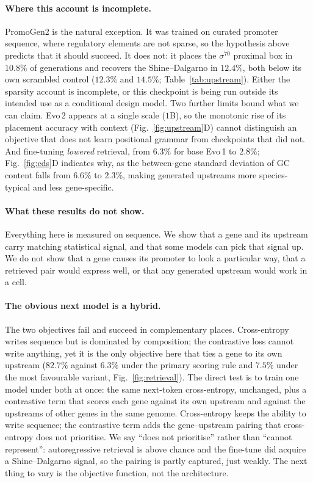 \documentclass{article}
\newcommand{\rev}[1]{\begingroup\color{red}#1\endgroup}
\begin{document}
\rev{\paragraph{Where this account is incomplete.}
PromoGen2 is the natural exception. It was trained on curated promoter sequence,
where regulatory elements are not sparse, so the hypothesis above predicts that
it should succeed. It does not: it places the $\sigma^{70}$ proximal box in
$10.8\%$ of generations and recovers the Shine--Dalgarno in $12.4\%$, both below
its own scrambled control ($12.3\%$ and $14.5\%$; Table~\ref{tab:upstream}).
Either the sparsity account is incomplete, or this checkpoint is being run
outside its intended use as a conditional design model. Two further limits bound
what we can claim. Evo\,2 appears at a single scale ($1$B), so the monotonic rise
of its placement accuracy with context (Fig.~\ref{fig:upstream}D) cannot
distinguish an objective that does not learn positional grammar from checkpoints
that did not. And fine-tuning \emph{lowered} retrieval, from $6.3\%$ for base
Evo\,1 to $2.8\%$; Fig.~\ref{fig:cds}D indicates why, as the between-gene
standard deviation of GC content falls from $6.6\%$ to $2.3\%$, making generated
upstreams more species-typical and less gene-specific.}

\paragraph{What these results do not show.}
Everything here is measured on sequence. We show that a gene and its upstream
carry matching statistical signal, and that some models can pick that signal up.
We do not show that a gene causes its promoter to look a particular way,
that a retrieved pair would express well, or that any generated upstream would
work in a cell. 

\paragraph{The obvious next model is a hybrid.}
The two objectives fail and succeed in complementary places. Cross-entropy writes
sequence but is dominated by composition; the contrastive loss cannot write
anything, yet it is the only objective here that ties a gene to its own upstream
($82.7\%$ against $6.3\%$ \rev{under the primary scoring rule and $7.5\%$ under
the most favourable variant}, Fig.~\ref{fig:retrieval}). The direct test is to train one
model under both at once: the same next-token cross-entropy, unchanged, plus a
contrastive term that scores each gene against its own upstream and against the
upstreams of other genes in the same genome. Cross-entropy keeps the ability to
write sequence; the contrastive term adds the gene--upstream pairing that
cross-entropy \rev{does not prioritise. We say ``does not prioritise'' rather
than ``cannot represent'': autoregressive retrieval is above chance and the
fine-tune did acquire a Shine--Dalgarno signal, so the pairing is partly
captured, just weakly.} The next thing to vary is the objective function, not the
architecture.
\end{document}
